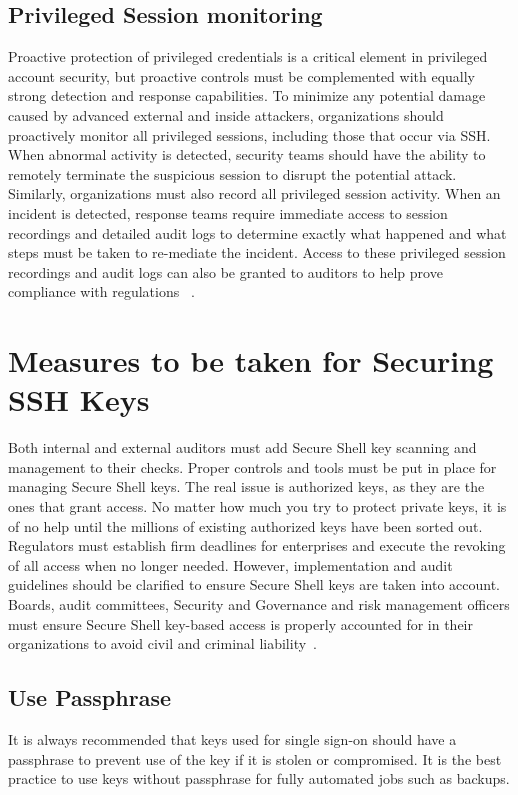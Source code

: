 \subsection{Privileged Session monitoring}
Proactive protection of privileged credentials is a critical element
in privileged account security, but proactive controls must be 
complemented with equally strong detection and response capabilities.
To minimize any potential damage caused by advanced external and
inside attackers, organizations should proactively monitor all
privileged sessions, including those that occur via SSH. When abnormal
activity is detected, security teams should have the ability to
remotely terminate the suspicious session to disrupt the potential attack.
Similarly, organizations must also record all privileged session activity.
When an incident is detected, response teams require immediate access to
session recordings and detailed audit logs to determine exactly what
happened and what steps must be taken to re-mediate the incident.
Access to these privileged session recordings and audit logs can also be
granted to auditors to help prove compliance with regulations
~\cite{hid-sp18-513-gutmann}.

\section{Measures to be taken for Securing SSH Keys}
Both internal and external auditors must add Secure Shell key 
scanning and management to their checks. Proper controls and tools
must be put in place for managing Secure Shell keys. The real issue
is authorized keys, as they are the ones that grant access. No
matter how much you try to protect private keys, it is of no help 
until the millions of existing authorized keys have been sorted out.
Regulators must establish firm deadlines for enterprises and execute 
the revoking of all access when no longer needed. However, 
implementation and audit guidelines should be clarified
to ensure Secure Shell keys are taken into account. Boards, 
audit committees, Security and Governance and risk management 
officers must ensure Secure Shell key-based access is
properly accounted for in their organizations to avoid civil 
and criminal liability~\cite{hid-sp18-513-network}.

\subsection{Use Passphrase}
It is always recommended that keys used for single sign-on should 
have a passphrase to prevent use of the key if it is stolen or 
compromised. It is the best practice to use keys without
passphrase for fully automated jobs such as backups.

